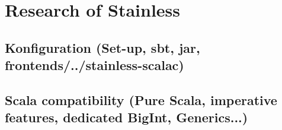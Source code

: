 \chapter{Research of Stainless}
\label{chap:research_stainless}

\section{Konfiguration (Set-up, sbt, jar, frontends/../stainless-scalac)}

\section{Scala compatibility (Pure Scala, imperative features, dedicated BigInt, Generics...)}

